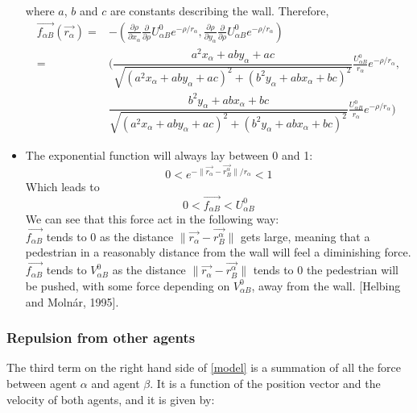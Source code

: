 \begin{itemize}
where $ a $, $ b $ and $ c $ are constants describing the wall.
Therefore,  
\begin{equation}
\begin{split}
    \vec{f_{\alpha B}}
	\left( \vec{r_{\alpha}} \right) =&
	-\left( 
		\frac{\partial \rho}{\partial x_{\alpha}}
		\frac{\partial}{\partial \rho}
		U^0_{\alpha B} e^{- \rho / r_{\alpha} }, 
		\frac{\partial \rho}{\partial y_{\alpha}}
		\frac{\partial}{\partial \rho}
		U^0_{\alpha B} e^{- \rho / r_{\alpha}}
	\right) \\
	=&
	( 
		\dfrac{a^{2}x_{\alpha}+aby_{\alpha}+ac}{
			\sqrt{
				\left(
					a^{2}x_{\alpha}+aby_{\alpha}+ac 
				\right) ^{2} + 
				\left( 
					b^{2}y_{\alpha}+abx_{\alpha}+bc
				\right) ^{2}
			}
		}
		\frac{U^0_{\alpha B}}{r_{\alpha}}
		e^{- \rho / r_{\alpha} },\\
		&\dfrac{b^{2}y_{\alpha}+abx_{\alpha}+bc}{
			\sqrt{
				\left(
					a^{2}x_{\alpha}+aby_{\alpha}+ac
				\right) ^{2} + 
				\left(
					b^{2}y_{\alpha}+abx_{\alpha}+bc
				\right) ^{2}
			}
		}
		\frac{U^0_{\alpha B}}{r_{\alpha}}
		e^{- \rho / r_{\alpha} }
	)    
\end{split}
\end{equation} 
\item The exponential function will always lay between 0 and 1:
\begin{equation}
0 < e^{ -\| \vec{r_{\alpha}} - \vec{r_{B}^{\alpha}} \| /r_\alpha} < 1
\end{equation}
Which leads to
\begin{equation}
0< \vec{f_{\alpha B}} < U^0_{\alpha B}
\end{equation}
We can see that this force act in the following way:\\
$\vec{f_{\alpha B}}$ tends to 0 as the distance $ \| \vec{r_{\alpha}} - \vec{r_{B}^{\alpha}} \|$ gets large, meaning that a pedestrian in a reasonably distance from the wall will feel a diminishing force. $\vec{f_{\alpha B}}$ tends to $V^0_{\alpha B}$ as the distance $ \| \vec{r_{\alpha}} - \vec{r_{B}^{\alpha}} \|$ tends to $0$ the pedestrian will be pushed, with some force depending on $V^0_{\alpha B}$, away from the wall. 
 [Helbing and Molnár, 1995]. %
\end{itemize}
 

\subsubsection{Repulsion from other agents}
The third term on the right hand side of \eqref{model} is a summation of all the 
force between agent $\alpha$ and agent $\beta$. It is a function of the position vector and the velocity of 
both agents, and it is given by:


